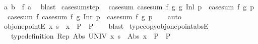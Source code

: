 \begin{isabellebody}
\ {\isachardoublequoteopen}{\isasymexists}a{\isachardot}{\kern0pt}\ b\ {\isacharequal}{\kern0pt}\ f\ a{\isachardoublequoteclose}\ \isamarkupfalse%
\ blast\isanewline
{}\isamarkupfalse%
%
\endisatagproof
{\isafoldproof}%
%
\isadelimproof
\isanewline
%
\endisadelimproof
\isanewline
{}\isamarkupfalse%
\ case{\isacharunderscore}{\kern0pt}sum{\isacharunderscore}{\kern0pt}step{\isacharcolon}{\kern0pt}\isanewline
\ \ {\isachardoublequoteopen}case{\isacharunderscore}{\kern0pt}sum\ {\isacharparenleft}{\kern0pt}case{\isacharunderscore}{\kern0pt}sum\ f{\isacharprime}{\kern0pt}\ g{\isacharprime}{\kern0pt}{\isacharparenright}{\kern0pt}\ g\ {\isacharparenleft}{\kern0pt}Inl\ p{\isacharparenright}{\kern0pt}\ {\isacharequal}{\kern0pt}\ case{\isacharunderscore}{\kern0pt}sum\ f{\isacharprime}{\kern0pt}\ g{\isacharprime}{\kern0pt}\ p{\isachardoublequoteclose}\isanewline
\ \ {\isachardoublequoteopen}case{\isacharunderscore}{\kern0pt}sum\ f\ {\isacharparenleft}{\kern0pt}case{\isacharunderscore}{\kern0pt}sum\ f{\isacharprime}{\kern0pt}\ g{\isacharprime}{\kern0pt}{\isacharparenright}{\kern0pt}\ {\isacharparenleft}{\kern0pt}Inr\ p{\isacharparenright}{\kern0pt}\ {\isacharequal}{\kern0pt}\ case{\isacharunderscore}{\kern0pt}sum\ f{\isacharprime}{\kern0pt}\ g{\isacharprime}{\kern0pt}\ p{\isachardoublequoteclose}\isanewline
%
\isadelimproof
\ \ %
\endisadelimproof
%
\isatagproof
{}\isamarkupfalse%
\ auto%
\endisatagproof
{\isafoldproof}%
%
\isadelimproof
\isanewline
%
\endisadelimproof
\isanewline
{}\isamarkupfalse%
\ obj{\isacharunderscore}{\kern0pt}one{\isacharunderscore}{\kern0pt}pointE{\isacharcolon}{\kern0pt}\ {\isachardoublequoteopen}{\isasymforall}x{\isachardot}{\kern0pt}\ s\ {\isacharequal}{\kern0pt}\ x\ {\isasymlongrightarrow}\ P\ {\isasymLongrightarrow}\ P{\isachardoublequoteclose}\isanewline
%
\isadelimproof
\ \ %
\endisadelimproof
%
\isatagproof
{}\isamarkupfalse%
\ blast%
\endisatagproof
{\isafoldproof}%
%
\isadelimproof
\isanewline
%
\endisadelimproof
\isanewline
{}\isamarkupfalse%
\ type{\isacharunderscore}{\kern0pt}copy{\isacharunderscore}{\kern0pt}obj{\isacharunderscore}{\kern0pt}one{\isacharunderscore}{\kern0pt}point{\isacharunderscore}{\kern0pt}absE{\isacharcolon}{\kern0pt}\isanewline
\ \ \ {\isachardoublequoteopen}type{\isacharunderscore}{\kern0pt}definition\ Rep\ Abs\ UNIV{\isachardoublequoteclose}\ {\isachardoublequoteopen}{\isasymforall}x{\isachardot}{\kern0pt}\ s\ {\isacharequal}{\kern0pt}\ Abs\ x\ {\isasymlongrightarrow}\ P{\isachardoublequoteclose}\ \ P\isanewline

\end{isabellebody}
